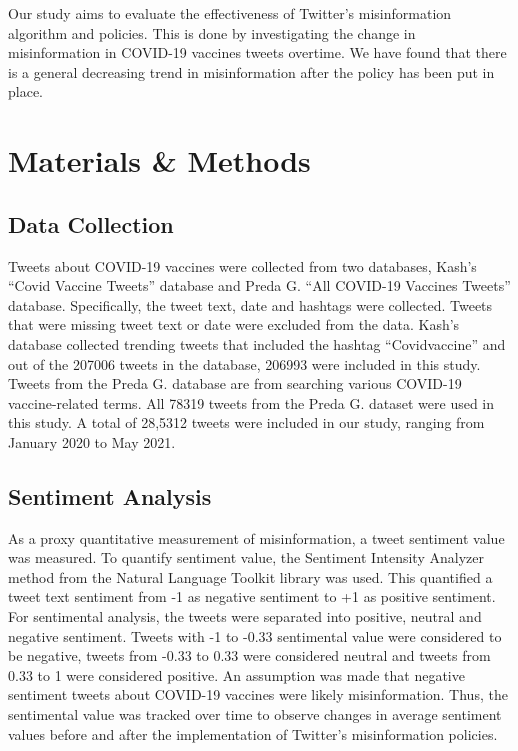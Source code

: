 \documentclass[10pt,twocolumn,letterpaper]{article}
\begin{document}
Our study aims to evaluate the effectiveness of Twitter’s misinformation algorithm and policies. This is done by investigating the change in misinformation in COVID-19 vaccines tweets overtime. We have found that there is a general decreasing trend in misinformation after the policy has been put in place.

\section{Materials \& Methods}

\subsection{Data Collection}

Tweets about COVID-19 vaccines were collected from two databases, Kash’s “Covid Vaccine Tweets” database\cite{kash_2021} and  Preda G. “All COVID-19 Vaccines Tweets” database\cite{preda_2021}. Specifically, the tweet text, date and hashtags were collected. Tweets that were missing tweet text or date were excluded from the data. Kash’s database collected trending tweets that included the hashtag “Covidvaccine” and out of the 207006 tweets in the database, 206993 were included in this study. Tweets from the Preda G. database are from searching various COVID-19 vaccine-related terms. All 78319 tweets from the Preda G. dataset were used in this study. A total of 28,5312 tweets were included in our study, ranging from January 2020 to May 2021.

\subsection{Sentiment Analysis}
As a proxy quantitative measurement of misinformation, a tweet sentiment value was measured. To quantify sentiment value, the Sentiment Intensity Analyzer method from the Natural Language Toolkit library was used. This quantified a tweet text sentiment from -1 as negative sentiment to +1 as positive sentiment. For sentimental analysis, the tweets were separated into positive, neutral and negative sentiment. Tweets with -1 to -0.33 sentimental value were considered to be negative, tweets from -0.33 to 0.33 were considered neutral and tweets from 0.33 to 1 were considered positive. An assumption was made that negative sentiment tweets about COVID-19 vaccines were likely misinformation. Thus, the sentimental value was tracked over time to observe changes in average sentiment values before and after the implementation of Twitter’s misinformation policies.
\end{document}
